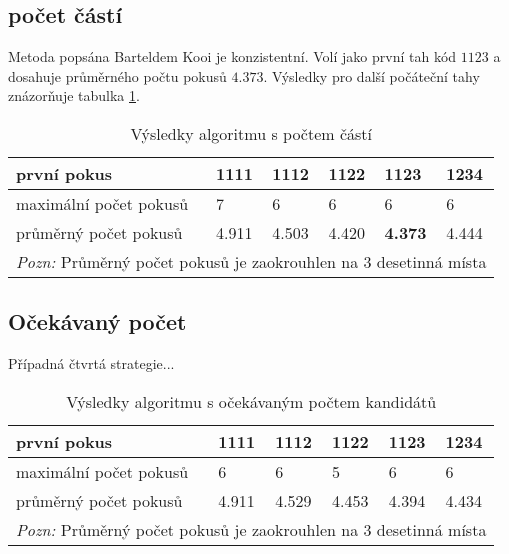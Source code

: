 \subsection{počet částí}
Metoda popsána Barteldem Kooi je konzistentní. Volí jako první tah kód $1123$ a dosahuje průměrného počtu pokusů $4.373$. Výsledky pro další počáteční tahy znázorňuje tabulka \ref{tabcastivysl}.


\begin{table}[h]
\centering
\begin{tabular}{l l l l l l}
\toprule
první pokus & 1111 & 1112 & 1122 & \textbf{1123} & 1234 \\
\midrule

maximální počet pokusů 
& 7 & 6 & 6 & 6 & 6 \\

průměrný počet pokusů 
& 4.911 & 4.503 & 4.420 & \textbf{4.373} & 4.444\\
\bottomrule
\multicolumn{6}{l}{\footnotesize \textit{Pozn:}
Průměrný počet pokusů je zaokrouhlen na $3$ desetinná místa}
\end{tabular}
\caption{Výsledky algoritmu s počtem částí}\label{tabcastivysl}
\end{table}


\subsection{Očekávaný počet}
Případná čtvrtá strategie...
\begin{table}[h]
\centering
\begin{tabular}{l l l l l l}
\toprule
první pokus & 1111 & 1112 & 1122 & 1123 & 1234 \\
\midrule

maximální počet pokusů 
& 6 & 6 & 5 & 6 & 6 \\

průměrný počet pokusů 
& 4.911 & 4.529 & 4.453 & 4.394 & 4.434 \\
\bottomrule
\multicolumn{6}{l}{\footnotesize \textit{Pozn:}
Průměrný počet pokusů je zaokrouhlen na $3$ desetinná místa}
\end{tabular}
\caption{Výsledky algoritmu s očekávaným počtem kandidátů}\label{tabminmaxvysl}
\end{table}


